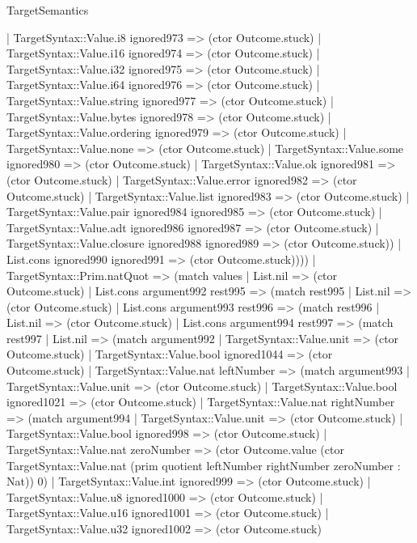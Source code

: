 \begin{lexlean}{TargetSemantics}
\begin{semanticmodule}
{            | TargetSyntax::Value.i8 ignored973 => (ctor Outcome.stuck)
            | TargetSyntax::Value.i16 ignored974 => (ctor Outcome.stuck)
            | TargetSyntax::Value.i32 ignored975 => (ctor Outcome.stuck)
            | TargetSyntax::Value.i64 ignored976 => (ctor Outcome.stuck)
            | TargetSyntax::Value.string ignored977 => (ctor Outcome.stuck)
            | TargetSyntax::Value.bytes ignored978 => (ctor Outcome.stuck)
            | TargetSyntax::Value.ordering ignored979 => (ctor Outcome.stuck)
            | TargetSyntax::Value.none => (ctor Outcome.stuck)
            | TargetSyntax::Value.some ignored980 => (ctor Outcome.stuck)
            | TargetSyntax::Value.ok ignored981 => (ctor Outcome.stuck)
            | TargetSyntax::Value.error ignored982 => (ctor Outcome.stuck)
            | TargetSyntax::Value.list ignored983 => (ctor Outcome.stuck)
            | TargetSyntax::Value.pair ignored984 ignored985 => (ctor Outcome.stuck)
            | TargetSyntax::Value.adt ignored986 ignored987 => (ctor Outcome.stuck)
            | TargetSyntax::Value.closure ignored988 ignored989 => (ctor Outcome.stuck))
          | List.cons ignored990 ignored991 => (ctor Outcome.stuck))))
    | TargetSyntax::Prim.natQuot => (match values
      | List.nil => (ctor Outcome.stuck)
      | List.cons argument992 rest995 => (match rest995
        | List.nil => (ctor Outcome.stuck)
        | List.cons argument993 rest996 => (match rest996
          | List.nil => (ctor Outcome.stuck)
          | List.cons argument994 rest997 => (match rest997
            | List.nil => (match argument992
              | TargetSyntax::Value.unit => (ctor Outcome.stuck)
              | TargetSyntax::Value.bool ignored1044 => (ctor Outcome.stuck)
              | TargetSyntax::Value.nat leftNumber => (match argument993
                | TargetSyntax::Value.unit => (ctor Outcome.stuck)
                | TargetSyntax::Value.bool ignored1021 => (ctor Outcome.stuck)
                | TargetSyntax::Value.nat rightNumber => (match argument994
                  | TargetSyntax::Value.unit => (ctor Outcome.stuck)
                  | TargetSyntax::Value.bool ignored998 => (ctor Outcome.stuck)
                  | TargetSyntax::Value.nat zeroNumber => (ctor Outcome.value (ctor TargetSyntax::Value.nat (prim quotient leftNumber rightNumber zeroNumber : Nat)) 0)
                  | TargetSyntax::Value.int ignored999 => (ctor Outcome.stuck)
                  | TargetSyntax::Value.u8 ignored1000 => (ctor Outcome.stuck)
                  | TargetSyntax::Value.u16 ignored1001 => (ctor Outcome.stuck)
                  | TargetSyntax::Value.u32 ignored1002 => (ctor Outcome.stuck)
}
\end{semanticmodule}
\end{lexlean}
